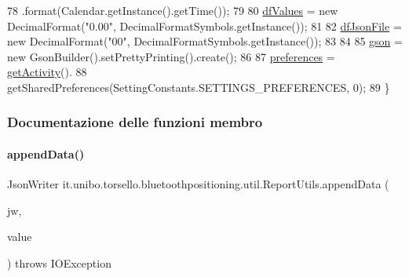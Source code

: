 \begin{DoxyCode}
78                 .format(Calendar.getInstance().getTime());
79 
80         \hyperlink{classit_1_1unibo_1_1torsello_1_1bluetoothpositioning_1_1util_1_1ReportUtils_afb07df801c89068760b260fb09916895_afb07df801c89068760b260fb09916895}{dfValues} = \textcolor{keyword}{new} DecimalFormat(\textcolor{stringliteral}{"0.00"}, DecimalFormatSymbols.getInstance());
81 
82         \hyperlink{classit_1_1unibo_1_1torsello_1_1bluetoothpositioning_1_1util_1_1ReportUtils_a29b88de66ca4b3e85b3cc86e9621c26a_a29b88de66ca4b3e85b3cc86e9621c26a}{dfJsonFile} = \textcolor{keyword}{new} DecimalFormat(\textcolor{stringliteral}{"00"}, DecimalFormatSymbols.getInstance());
83 
84 
85         \hyperlink{classit_1_1unibo_1_1torsello_1_1bluetoothpositioning_1_1util_1_1ReportUtils_a974d9bac8edb83847a34b20db0299fca_a974d9bac8edb83847a34b20db0299fca}{gson} = \textcolor{keyword}{new} GsonBuilder().setPrettyPrinting().create();
86 
87         \hyperlink{classit_1_1unibo_1_1torsello_1_1bluetoothpositioning_1_1util_1_1ReportUtils_af1f57227f8c42073b4f8f2b65e86ebd7_af1f57227f8c42073b4f8f2b65e86ebd7}{preferences} = \hyperlink{classit_1_1unibo_1_1torsello_1_1bluetoothpositioning_1_1util_1_1ReportUtils_a397da2904c606315301d19eb39451181_a397da2904c606315301d19eb39451181}{getActivity}().
88                 getSharedPreferences(SettingConstants.SETTINGS\_PREFERENCES, 0);
89     \}
\end{DoxyCode}


\subsubsection{Documentazione delle funzioni membro}
\hypertarget{classit_1_1unibo_1_1torsello_1_1bluetoothpositioning_1_1util_1_1ReportUtils_ad5cf6eb0aa41a0e3eeaabfec16f47c28_ad5cf6eb0aa41a0e3eeaabfec16f47c28}{}\label{classit_1_1unibo_1_1torsello_1_1bluetoothpositioning_1_1util_1_1ReportUtils_ad5cf6eb0aa41a0e3eeaabfec16f47c28_ad5cf6eb0aa41a0e3eeaabfec16f47c28} 
\paragraph{\texorpdfstring{append\+Data()}{appendData()}}
{\footnotesize\ttfamily Json\+Writer it.\+unibo.\+torsello.\+bluetoothpositioning.\+util.\+Report\+Utils.\+append\+Data (\begin{DoxyParamCaption}\item[{Json\+Writer}]{jw,  }\item[{Array\+List$<$ Double $>$}]{value }\end{DoxyParamCaption}) throws I\+O\+Exception\hspace{0.3cm}{\ttfamily [private]}}



